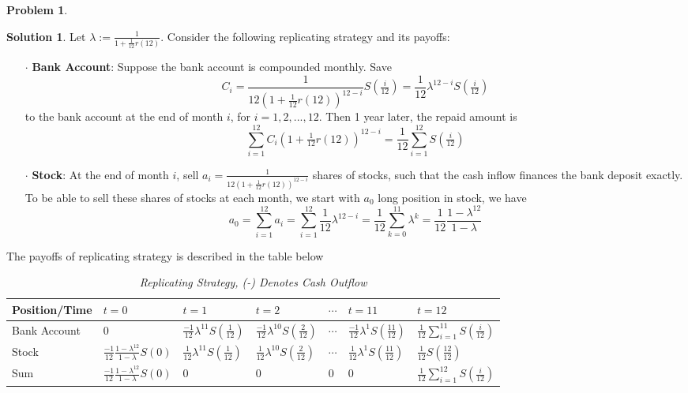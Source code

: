 \documentclass[a4paper, 10pt]{article}
\renewcommand{\arraystretch}{1.4}
\theoremstyle{definition}
\newtheorem{problem}{Problem}
\theoremstyle{hSol}
\newtheorem*{solution}{Solution}
\begin{document}
\begin{problem} 
\end{problem}
\begin{solution}
Let $\lambda := \frac{1}{1+\frac{1}{12}r(12)}$. Consider the following replicating strategy and its payoffs:
\begin{itemize}
  \item[$\cdot$] \textbf{Bank Account}: Suppose the bank account is compounded monthly. Save 
  $$
  C_i = \frac{1}{12(1+\frac{1}{12}r(12))^{12-i}} S\left(\tfrac{i}{12}\right) = \frac{1}{12}\lambda^{12-i} S\left(\tfrac{i}{12}\right)  $$
  to the bank account at the end of month $i$, for $i=1,2,...,12$. Then 1 year later, the repaid amount is
  $$
  \sum_{i=1}^{12} C_i \left(1+\tfrac{1}{12}r(12)\right)^{12-i} = \frac{1}{12}\sum_{i=1}^{12} S\left(\tfrac{i}{12}\right)
  $$
  \item[$\cdot$] \textbf{Stock}: At the end of month $i$, sell $a_i = \frac{1}{12(1+\frac{1}{12}r(12))^{12-i}}$ shares of stocks, such that the cash inflow finances the bank deposit exactly. To be able to sell these shares of stocks at each month, we start with $a_0$ long position in stock, we have
  $$
  a_0 = \sum_{i=1}^{12} a_i = \sum_{i=1}^{12}\frac{1}{12}\lambda^{12-i} = \frac{1}{12} \sum_{k=0}^{11} \lambda^k = \frac{1}{12}\frac{1- \lambda^{12}}{1- \lambda}
  $$
\end{itemize}
The payoffs of replicating strategy is described in the table below

\begin{table}[H]
\scriptsize
\vspace{-10pt}
\caption{\textit{Replicating Strategy, (-) Denotes Cash Outflow}}
\vspace{3pt}
\centering
\def\arraystretch{2}
\begin{tabular}{|m{2cm}|m{1.5cm}|m{1.5cm}|m{1.5cm}|m{1.5cm}|m{1.5cm}|m{2cm}|}
\hline
Position/Time &$t=0$ & $t=1$ & $t=2$ & $\cdots$ & $t=11$ & $t=12$\\ 
\hline
Bank Account & $0$ & $\frac{-1}{12}\lambda^{11} S\left(\tfrac{1}{12}\right)$ & $\frac{-1}{12}\lambda^{10} S\left(\tfrac{2}{12}\right)$ &$\cdots$&$\frac{-1}{12}\lambda^{1} S\left(\tfrac{11}{12}\right)$ & $\tfrac{1}{12}\sum_{i=1}^{11} S(\tfrac{i}{12})$\\
\hline
Stock &$\frac{-1}{12}\frac{1- \lambda^{12}}{1- \lambda}S(0)$& $\frac{1}{12}\lambda^{11} S\left(\tfrac{1}{12}\right)$&
$\frac{1}{12}\lambda^{10} S\left(\tfrac{2}{12}\right)$& $\cdots$&$\frac{1}{12}\lambda^{1} S\left(\tfrac{11}{12}\right)$&$\frac{1}{12} S\left(\tfrac{12}{12}\right)$\\
\hline
Sum &$\frac{-1}{12}\frac{1- \lambda^{12}}{1- \lambda}S(0)$&  0&0&0&0&$\tfrac{1}{12}\sum_{i=1}^{12}S(\tfrac{i}{12})$\\
\hline
\end{tabular}
\label{tab:rep2}
\end{table}


\end{solution}
\end{document}
